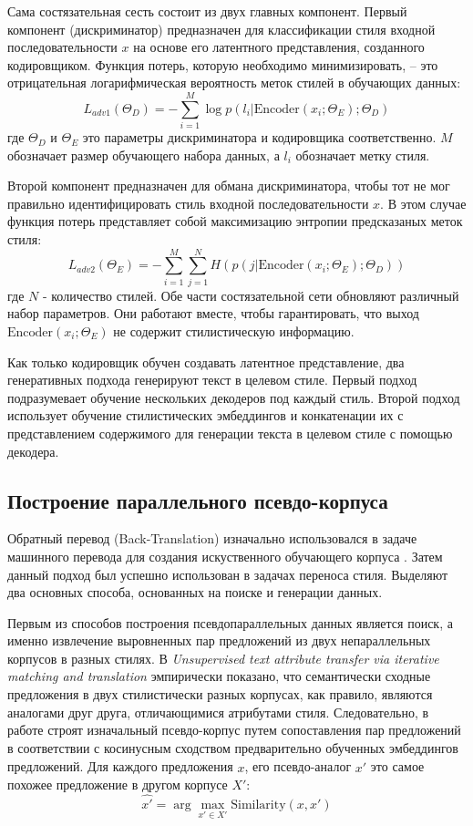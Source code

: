 Сама состязательная сесть состоит из двух главных компонент.
Первый компонент (дискриминатор) предназначен для классификации стиля входной последовательности $x$ на основе его латентного представления, созданного кодировщиком.
Функция потерь, которую необходимо минимизировать, -- это отрицательная логарифмическая вероятность меток стилей в обучающих данных:
$$
L_{adv1}(\Theta_D) =
- \sum_{i=1}^{M} \log p (l_i | \text{Encoder}(x_i; \Theta_E); \Theta_D)
$$
где $\Theta_D$ и $\Theta_E$ это параметры дискриминатора и кодировщика соответственно.  $M$ обозначает размер обучающего набора данных, а $l_i$ обозначает метку стиля.

Второй компонент предназначен для обмана дискриминатора, чтобы тот не мог правильно идентифицировать стиль входной последовательности $x$.
В этом случае функция потерь представляет собой максимизацию энтропии предсказаных меток стиля:
$$
L_{adv2}(\Theta_E) =
- \sum_{i=1}^M \sum_{j=1}^N
H(p(j|\text{Encoder}(x_i; \Theta_E); \Theta_D))
$$
где $N$ - количество стилей.
Обе части состязательной сети обновляют различный набор параметров.
Они работают вместе, чтобы гарантировать, что выход $\text{Encoder}(x_i;\Theta_E)$ не содержит стилистическую информацию.

Как только кодировщик обучен создавать латентное представление, два генеративных подхода генерируют текст в целевом стиле.
Первый подход подразумевает обучение нескольких декодеров под каждый стиль.
Второй подход использует обучение стилистических эмбеддингов и конкатенации их с представлением содержимого для генерации текста в целевом стиле с помощью декодера.

\subsection{Построение параллельного псевдо-корпуса}
\label{cha:analysis:subsection:backtranslation}
Обратный перевод (Back-Translation) изначально использовался в задаче машинного перевода для создания искуственного обучающего корпуса \cite{sennrich2016improving}.
Затем данный подход был успешно использован в задачах переноса стиля.
Выделяют два основных способа, основанных на поиске и генерации данных.

Первым из способов построения псевдопараллельных данных является поиск, а именно извлечение выровненных пар предложений из двух непараллельных корпусов в разных стилях.
В \textit{Unsupervised text attribute transfer via iterative matching and translation} \cite{jin2020imat} эмпирически показано, что семантически сходные предложения в двух стилистически разных корпусах, как правило, являются аналогами друг друга, отличающимися атрибутами стиля.
Следовательно, в работе строят изначальный псевдо-корпус путем сопоставления пар предложений в соответствии с косинусным сходством предварительно обученных эмбеддингов предложений.
Для каждого предложения $x$, его псевдо-аналог $\widehat{x'}$ это самое похожее предложение в другом корпусе $X'$:
$$
\widehat{x'} = \arg \max_{x' \in X'} \text{Similarity}(x, x')
$$

